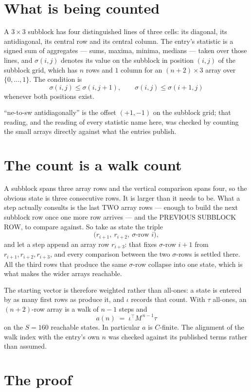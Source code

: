 \documentclass[11pt,a4paper]{article}
\theoremstyle{plain}
\theoremstyle{definition}
\begin{document}
\section{What is being counted}

A $3\times3$ subblock has four distinguished lines of three cells: its diagonal, its
antidiagonal, its central row and its central column. The entry's statistic is a signed sum of
aggregates --- sums, maxima, minima, medians --- taken over those lines, and $\sigma(i,j)$
denotes its value on the subblock in position $(i,j)$ of the subblock grid, which has $n$ rows
and $1$ column for an $(n+2)\times3$ array over $\{0,\dots,1\}$. The condition is
\[
\sigma(i,j)\le\sigma(i,j+1),\qquad \sigma(i,j)\le\sigma(i+1,j)
\]
whenever both positions exist.

``ne-to-sw antidiagonally'' is the offset $(+1,-1)$ on the subblock grid; that reading, and
the reading of every statistic name here, was checked by counting the small arrays directly
against what the entries publish.

\section{The count is a walk count}

A subblock spans three array rows and the vertical comparison spans four, so the obvious state
is three consecutive rows. It is larger than it needs to be. What a step actually consults is
the last TWO array rows --- enough to build the next subblock row once one more row arrives ---
and the PREVIOUS SUBBLOCK ROW, to compare against. So take as state the triple
\[
\bigl(r_{i+1},\ r_{i+2},\ \sigma\text{-row }i\bigr),
\]
and let a step append an array row $r_{i+3}$: that fixes $\sigma$-row $i+1$ from
$r_{i+1},r_{i+2},r_{i+3}$, and every comparison between the two $\sigma$-rows is settled
there. All the third rows that produce the same $\sigma$-row collapse into one state, which is
what makes the wider arrays reachable.

The starting vector is therefore weighted rather than all-ones: a state is entered by as many
first rows as produce it, and $\iota$ records that count. With $\tau$ all-ones, an
$(n+2)$-row array is a walk of $n-1$ steps and
\[
a(n)\;=\;\iota^{\!\top}M^{\,n-1}\tau
\]
on the $S=160$ reachable states. In particular $a$ is $C$-finite. The alignment of the walk
index with the entry's own $n$ was checked against its published terms rather than assumed.

\section{The proof}
\end{document}
